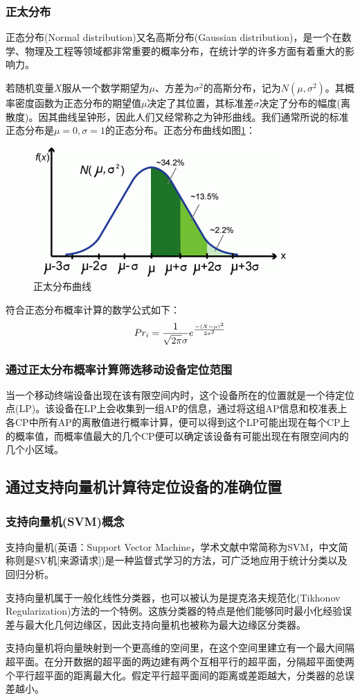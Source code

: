 \documentclass[UTF8, twocolumn ]{ctexart}
\begin{document}
\subsubsection{正太分布}
正态分布(Normal distribution)又名高斯分布(Gaussian distribution)，是一个在数学、物理及工程等领域都非常重要的概率分布，在统计学的许多方面有着重大的影响力。
\par
若随机变量$X$服从一个数学期望为$\mu$、方差为$\sigma^{2}$的高斯分布，记为$N(\mu,\sigma^{2})$。其概率密度函数为正态分布的期望值$\mu$决定了其位置，其标准差$\sigma$决定了分布的幅度(离散度)。因其曲线呈钟形，因此人们又经常称之为钟形曲线。我们通常所说的标准正态分布是$\mu=0,\sigma=1$的正态分布。正态分布曲线如图\ref{fig:no6}：
\begin{figure}[!ht]\centering
  \includegraphics[keepaspectratio, scale=0.7]{no6.png}
  \caption{正太分布曲线\label{fig:no6}} 
\end{figure}
\par
符合正态分布概率计算的数学公式如下：
\begin{equation}\centering
  Pr_{i}=\frac{1}{\sqrt{2\pi}\sigma}e^{\frac{-(X-\mu)^{2}}{2\sigma^{2}}}
\end{equation}
\subsubsection{通过正太分布概率计算筛选移动设备定位范围}
当一个移动终端设备出现在该有限空间内时，这个设备所在的位置就是一个待定位点(LP)。该设备在LP上会收集到一组AP的信息，通过将这组AP信息和校准表上各CP中所有AP的离散值进行概率计算，便可以得到这个LP可能出现在每个CP上的概率值，而概率值最大的几个CP便可以确定该设备有可能出现在有限空间内的几个小区域。

\subsection{通过支持向量机计算待定位设备的准确位置}
\subsubsection{支持向量机(SVM)概念}
支持向量机(英语：Support Vector Machine，学术文献中常简称为SVM，中文简称则是SV机[来源请求])是一种监督式学习的方法，可广泛地应用于统计分类以及回归分析。
\par
支持向量机属于一般化线性分类器，也可以被认为是提克洛夫规范化(Tikhonov Regularization)方法的一个特例。这族分类器的特点是他们能够同时最小化经验误差与最大化几何边缘区，因此支持向量机也被称为最大边缘区分类器。
\par
支持向量机将向量映射到一个更高维的空间里，在这个空间里建立有一个最大间隔超平面。在分开数据的超平面的两边建有两个互相平行的超平面，分隔超平面使两个平行超平面的距离最大化。假定平行超平面间的距离或差距越大，分类器的总误差越小。
\end{document}
